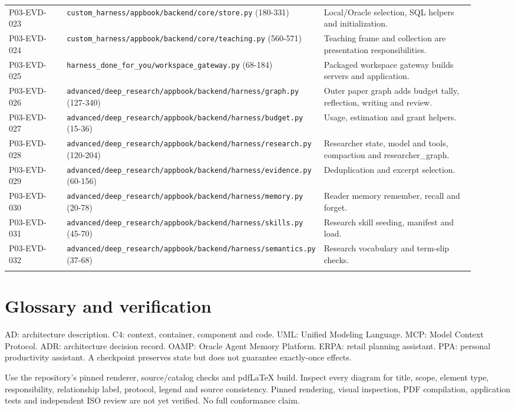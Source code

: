 \documentclass[10pt,letterpaper]{article}
\begin{document}
\begin{longtable}{@{}>{\raggedright\arraybackslash}p{0.16\linewidth}>{\raggedright\arraybackslash}p{0.34\linewidth}>{\raggedright\arraybackslash}p{0.42\linewidth}@{}}
P03-EVD-023 & \nolinkurl{custom_harness/appbook/backend/core/store.py} (180-331) & Local/Oracle selection, SQL helpers and initialization.\\\addlinespace
P03-EVD-024 & \nolinkurl{custom_harness/appbook/backend/core/teaching.py} (560-571) & Teaching frame and collection are presentation responsibilities.\\\addlinespace
P03-EVD-025 & \nolinkurl{harness_done_for_you/workspace_gateway.py} (68-184) & Packaged workspace gateway builds servers and application.\\\addlinespace
P03-EVD-026 & \nolinkurl{advanced/deep_research/appbook/backend/harness/graph.py} (127-340) & Outer paper graph adds budget tally, reflection, writing and review.\\\addlinespace
P03-EVD-027 & \nolinkurl{advanced/deep_research/appbook/backend/harness/budget.py} (15-36) & Usage, estimation and grant helpers.\\\addlinespace
P03-EVD-028 & \nolinkurl{advanced/deep_research/appbook/backend/harness/research.py} (120-204) & Researcher state, model and tools, compaction and researcher\_graph.\\\addlinespace
P03-EVD-029 & \nolinkurl{advanced/deep_research/appbook/backend/harness/evidence.py} (60-156) & Deduplication and excerpt selection.\\\addlinespace
P03-EVD-030 & \nolinkurl{advanced/deep_research/appbook/backend/harness/memory.py} (20-78) & Reader memory remember, recall and forget.\\\addlinespace
P03-EVD-031 & \nolinkurl{advanced/deep_research/appbook/backend/harness/skills.py} (45-70) & Research skill seeding, manifest and load.\\\addlinespace
P03-EVD-032 & \nolinkurl{advanced/deep_research/appbook/backend/harness/semantics.py} (37-68) & Research vocabulary and term-slip checks.\\\addlinespace
\bottomrule\end{longtable}

\section{Glossary and verification}
AD: architecture description. C4: context, container, component and code. UML: Unified Modeling Language. MCP: Model Context Protocol. ADR: architecture decision record. OAMP: Oracle Agent Memory Platform. ERPA: retail planning assistant. PPA: personal productivity assistant. A checkpoint preserves state but does not guarantee exactly-once effects.
\par
Use the repository's pinned renderer, source/catalog checks and pdfLaTeX build. Inspect every diagram for title, scope, element type, responsibility, relationship label, protocol, legend and source consistency. Pinned rendering, visual inspection, PDF compilation, application tests and independent ISO review are not yet verified. No full conformance claim.
\end{document}
